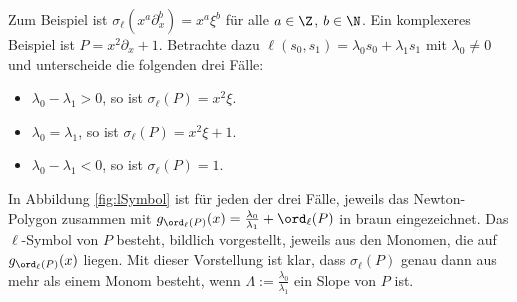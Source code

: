\begin{bsp} \label{exmp:lSymbol}
Zum Beispiel ist $\sigma_\ell(x^a\partial_x^b)=x^a\xi^b$ für alle
$a\in\Z$, $b\in\N$. Ein komplexeres Beispiel ist $P=x^2\partial_x+1$. Betrachte
dazu $\ell(s_0,s_1)=\lambda_0s_0+\lambda_1s_1$ mit $\lambda_0\neq0$ und
unterscheide die folgenden drei Fälle:
\begin{itemize}
\item $\lambda_0-\lambda_1>0$, so ist $\sigma_\ell(P)=x^2\xi$.
\item $\lambda_0=\lambda_1$, so ist $\sigma_\ell(P)=x^2\xi+1$.
\item $\lambda_0-\lambda_1<0$, so ist $\sigma_\ell(P)=1$.
\end{itemize}
In Abbildung \ref{fig:lSymbol} ist für jeden der drei Fälle, jeweils das
Newton-Polygon zusammen mit
$g_{\ord_\ell(P)}(x)=\frac{\lambda_0}{\lambda_1}+\ord_\ell(P)$ in braun
eingezeichnet. Das $\ell$-Symbol von $P$ besteht, bildlich vorgestellt, jeweils
aus den Monomen, die auf $g_{\ord_\ell(P)}(x)$ \glqq liegen\grqq. Mit dieser
Vorstellung ist klar, dass $\sigma_\ell(P)$ genau dann aus mehr als einem
Monom besteht, wenn $\Lambda:=\frac{\lambda_0}{\lambda_1}$ ein Slope von $P$
ist.
\begin{figure}[H] %
  \begin{minipage}[hbt]{0,32\textwidth}
    \begin{center}
    \end{center}
  \end{minipage}
  \begin{minipage}[hbt]{0,32\textwidth}
    \begin{center}

\end{center}
\end{minipage}
\end{figure}
\end{bsp}
